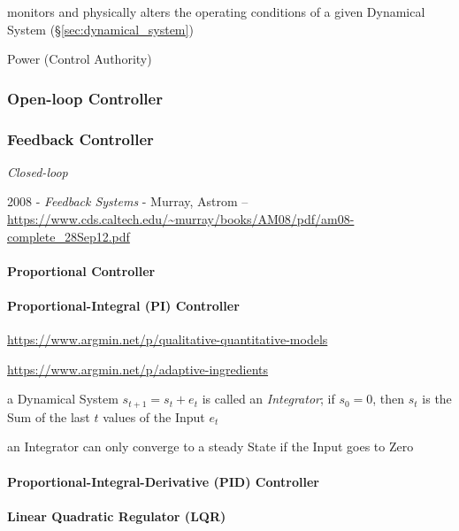 
monitors and physically alters the operating conditions of a given
Dynamical System (\S\ref{sec:dynamical_system})

Power (Control Authority)



\subsubsection{Open-loop Controller}\label{sec:open_loop}

\subsubsection{Feedback Controller}\label{sec:feedback_controller}

\emph{Closed-loop}

2008 - \emph{Feedback Systems} - Murray, Astrom --
\url{https://www.cds.caltech.edu/~murray/books/AM08/pdf/am08-complete_28Sep12.pdf}



\paragraph{Proportional Controller}\label{sec:proportional_controller}\hfill

\paragraph{Proportional-Integral (PI) Controller}\label{sec:pi_controller}\hfill

\url{https://www.argmin.net/p/qualitative-quantitative-models}

\url{https://www.argmin.net/p/adaptive-ingredients}

a Dynamical System $s_{t+1} = s_t + e_t$ is called an \emph{Integrator}; if
$s_0 = 0$, then $s_t$ is the Sum of the last $t$ values of the Input $e_t$

an Integrator can only converge to a steady State if the Input goes to Zero



\paragraph{Proportional-Integral-Derivative (PID) Controller}
\label{sec:pid_controller}\hfill

\paragraph{Linear Quadratic Regulator (LQR)}\label{sec:lqr}\hfill

